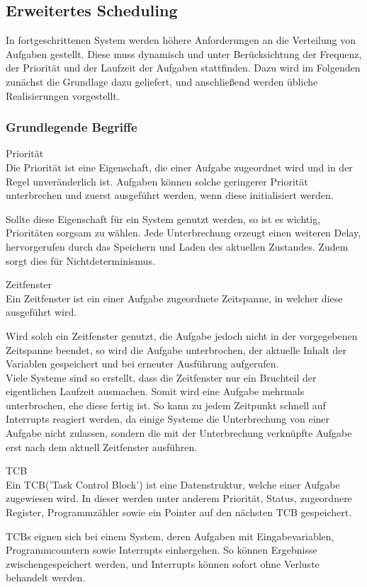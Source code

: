 \subsection{Erweitertes Scheduling}\label{2.7}
In fortgeschrittenen System werden höhere Anforderungen an die Verteilung von Aufgaben gestellt. Diese muss dynamisch und unter Berücksichtung der Frequenz, der Priorität und der Laufzeit der Aufgaben stattfinden. Dazu wird im Folgenden zunächst die Grundlage dazu geliefert, und anschließend werden übliche Realisierungen vorgestellt.

\subsubsection{Grundlegende Begriffe}
\begin{definition}{Priorität}\\
Die Priorität ist eine Eigenschaft, die einer Aufgabe zugeordnet wird und in der Regel unveränderlich ist. Aufgaben können solche geringerer Priorität unterbrechen und zuerst ausgeführt werden, wenn diese initialisiert werden.
\end{definition}
Sollte diese Eigenschaft für ein System genutzt werden, so ist es wichtig, Prioritäten sorgsam zu wählen. Jede Unterbrechung erzeugt einen weiteren Delay, hervorgerufen durch das Speichern und Laden des aktuellen Zustandes. Zudem sorgt dies für Nichtdeterminismus.
\begin{definition}{Zeitfenster}\\
Ein Zeitfenster ist ein einer Aufgabe zugeordnete Zeitspanne, in welcher diese ausgeführt wird.
\end{definition}
Wird solch ein Zeitfenster genutzt, die Aufgabe jedoch nicht in der vorgegebenen Zeitspanne beendet, so wird die Aufgabe unterbrochen, der aktuelle Inhalt der Variablen gespeichert und bei erneuter Ausführung aufgerufen.\\
Viele Systeme sind so erstellt, dass die Zeitfenster nur ein Bruchteil der eigentlichen Laufzeit ausmachen. Somit wird eine Aufgabe mehrmals unterbrochen, ehe diese fertig ist. So kann zu jedem Zeitpunkt schnell auf Interrupts reagiert werden, da einige Systeme die Unterbrechung von einer Aufgabe nicht zulassen, sondern die mit der Unterbrechung verknüpfte Aufgabe erst nach dem aktuell Zeitfenster ausführen.
\begin{definition}{TCB}\\
Ein TCB('Task Control Block') ist eine Datenstruktur, welche einer Aufgabe zugewiesen wird. In dieser werden unter anderem Priorität, Status, zugeordnere Register, Programmzähler sowie ein Pointer auf den nächsten TCB gespeichert.
\end{definition}
TCBs eignen sich bei einem System, deren Aufgaben mit Eingabevariablen, Programmcountern sowie Interrupts einhergehen. So können Ergebnisse zwischengespeichert werden, und Interrupts können sofort ohne Verluste behandelt werden.



